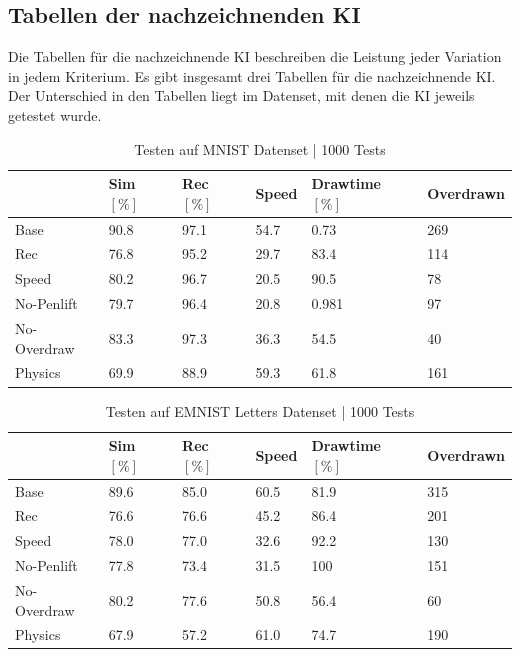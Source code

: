 \subsection{Tabellen der nachzeichnenden KI}\label{sub:r_tab_nachzeich}
Die Tabellen für die nachzeichnende KI beschreiben die Leistung jeder Variation
in jedem Kriterium. Es gibt insgesamt drei Tabellen für die nachzeichnende KI.
Der Unterschied in den Tabellen liegt im Datenset, mit denen die KI jeweils
getestet wurde.

\begin{table}[!ht]
    \centering
    \caption{Testen auf MNIST Datenset | 1000 Tests}\label{tab:MNIST}
    \begin{tabular}{|l|l|l|l|l|l|}
            \hline ~ & Sim $[\%]$ & Rec $[\%]$ & Speed & Drawtime $[\%]$ & Overdrawn \\ \hline
            Base & 90.8 & 97.1 & 54.7 & 0.73 & 269 \\ \hline
            Rec & 76.8 & 95.2 & 29.7 & 83.4 & 114 \\ \hline
            Speed & 80.2 & 96.7 & 20.5 & 90.5 & 78 \\ \hline
            No-Penlift & 79.7 & 96.4 & 20.8 & 0.981 & 97 \\ \hline
            No-Overdraw & 83.3 & 97.3 & 36.3 & 54.5 & 40 \\ \hline
            Physics & 69.9 & 88.9 & 59.3 & 61.8 & 161 \\ \hline
        \end{tabular}
\end{table}

\begin{table}[!ht]
    \centering
    \caption{Testen auf EMNIST Letters Datenset | 1000 Tests}\label{tab:EMNIST}
    \begin{tabular}{|l|l|l|l|l|l|}
        \hline ~ & Sim $[\%]$ & Rec $[\%]$ & Speed & Drawtime $[\%]$ & Overdrawn \\ \hline
        Base & 89.6 & 85.0 & 60.5 & 81.9 & 315 \\ \hline
        Rec & 76.6 & 76.6 & 45.2 & 86.4 & 201 \\ \hline
        Speed & 78.0 & 77.0 & 32.6 & 92.2 & 130 \\ \hline
        No-Penlift & 77.8 & 73.4 & 31.5 & 100 & 151 \\ \hline
        No-Overdraw & 80.2 & 77.6 & 50.8 & 56.4 & 60 \\ \hline
        Physics & 67.9 & 57.2 & 61.0 & 74.7 & 190 \\ \hline
    \end{tabular}
\end{table}


